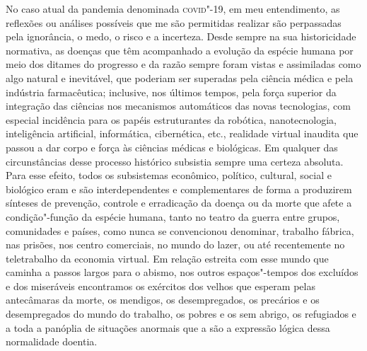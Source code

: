 No caso atual da pandemia denominada \textsc{covid}"-19, em meu entendimento, as
reflexões ou análises possíveis que me são permitidas realizar são
perpassadas pela ignorância, o medo, o risco e a incerteza. Desde sempre
na sua historicidade normativa, as doenças que têm acompanhado a
evolução da espécie humana por meio dos ditames do progresso e da razão
sempre foram vistas e assimiladas como algo natural e inevitável, que
poderiam ser superadas pela ciência médica e pela indústria
farmacêutica; inclusive, nos últimos tempos, pela força superior da
integração das ciências nos mecanismos automáticos das novas
tecnologias, com especial incidência para os papéis estruturantes da
robótica, nanotecnologia, inteligência artificial, informática,
cibernética, etc., realidade virtual inaudita que passou a dar corpo e
força às ciências médicas e biológicas. Em qualquer das circunstâncias
desse processo histórico subsistia sempre uma certeza absoluta. Para
esse efeito, todos os subsistemas econômico, político, cultural, social
e biológico eram e são interdependentes e complementares de forma a
produzirem sínteses de prevenção, controle e erradicação da doença ou da
morte que afete a condição"-função da espécie humana, tanto no teatro da
guerra entre grupos, comunidades e países, como nunca se convencionou
denominar, trabalho fábrica, nas prisões, nos centro comerciais, no
mundo do lazer, ou até recentemente no teletrabalho da economia virtual.
Em relação estreita com esse mundo que caminha a passos largos para o
abismo, nos outros espaços"-tempos dos excluídos e dos miseráveis
encontramos os exércitos dos velhos que esperam pelas antecâmaras da
morte, os mendigos, os desempregados, os precários e os desempregados do
mundo do trabalho, os pobres e os sem abrigo, os refugiados e a toda a
panóplia de situações anormais que a são a expressão lógica dessa
normalidade doentia.

